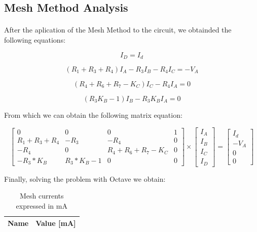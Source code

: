 \subsection{Mesh Method Analysis}

\paragraph{} After the aplication of the Mesh Method to the circuit, we obtainded the following equations:

\begin{equation}
	I_D = I_d
	\label{eq:1}
\end{equation}

\begin{equation}
	(R_1 + R_3 + R_4) I_A -R_3 I_B - R_4 I_C = - V_A
	\label{eq:1}
\end{equation}

\begin{equation}
	(R_4 + R_6 + R_7 - K_C) I_C - R_4 I_A = 0
	\label{eq:2}
\end{equation}

\begin{equation}
	(R_3 K_B - 1) I_B - R_3 K_B I_A = 0
	\label{eq:3}
\end{equation}

From which we can obtain the following matrix equation:

\begin{equation}
\begin{bmatrix}
	0 & 0 & 0 & 1 \\
	R_1 + R_3 + R_4 &  -R_3 & - R_4 & 0 \\
	-R_4 & 0 & R_4 + R_6 + R_7 - K_C & 0 \\
	-R_3 * K_B & R_3 * K_B - 1 & 0 & 0
\end{bmatrix}
\times
\begin{bmatrix}
	I_A \\
	I_B \\
	I_C \\
	I_D
\end{bmatrix}
=
\begin{bmatrix}
	I_d \\
	-V_A \\
	0 \\
	0
	\label{m:1}
\end{bmatrix}
\end{equation}


Finally, solving the problem with Octave we obtain:

\begin{table}[hbt!]
  \centering
  \begin{tabular}{|l|r|}
    \hline    
    {\bf Name} & {\bf Value [mA]} \\ \hline
    
  \end{tabular}
  \caption{Mesh currents expressed in mA}
  \label{tab:op}
\end{table}

